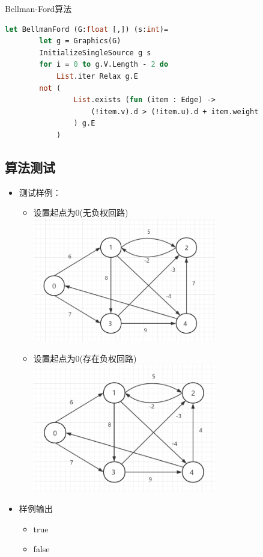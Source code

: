 \documentclass[a4paper]{article}
\begin{document}
Bellman-Ford算法
\begin{lstlisting}[language=ML]
    let BellmanFord (G:float [,]) (s:int)= 
        let g = Graphics(G)
        InitializeSingleSource g s
        for i = 0 to g.V.Length - 2 do
            List.iter Relax g.E
        not (
                List.exists (fun (item : Edge) -> 
                    (!item.v).d > (!item.u).d + item.weight
                ) g.E
            )
\end{lstlisting}

\subsection{算法测试}

\begin{itemize}
\item
    测试样例：
    \begin{itemize}
    \item
        设置起点为0(无负权回路)\\
       \includegraphics[width=8cm]{4-1-1.png}
    \item
        设置起点为0(存在负权回路)\\
       \includegraphics[width=8cm]{4-1-2.png}
    \end{itemize}
\item
    样例输出
    \begin{itemize}
    \item
        true
    \item
        false
    \end{itemize}
\end{itemize}
\end{document}
